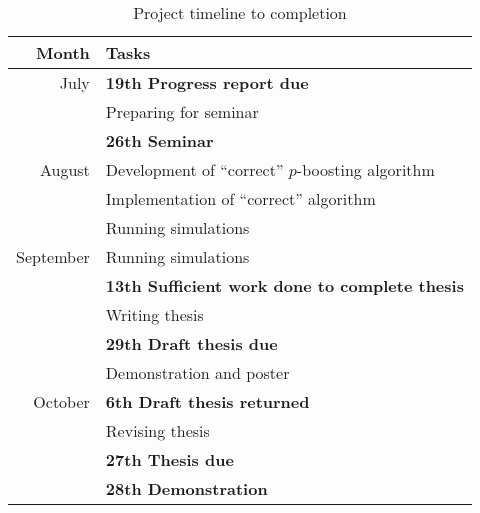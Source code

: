 \begin{table}\begin{center}
\begin{tabular}{r l}
\textbf{Month}		& \textbf{Tasks} \\ \hline \hline
July			& \textbf{19th Progress report due} \\
			& Preparing for seminar \\
			& \textbf{26th Seminar} \\ \hline
August			& Development of ``correct'' $p$-boosting algorithm \\
			& Implementation of ``correct'' algorithm \\
			& Running simulations \\ \hline
September		& Running simulations \\
			& \textbf{13th Sufficient work done to
			  complete thesis} \\
			& Writing thesis \\
			& \textbf{29th Draft thesis due} \\
			& Demonstration and poster \\ \hline
October			& \textbf{6th Draft thesis returned} \\
			& Revising thesis \\
			& \textbf{27th Thesis due} \\
			& \textbf{28th Demonstration} \\
\hline
\end{tabular}
\caption{Project timeline to completion}
\label{table:new timeline}
\end{center}\end{table}


